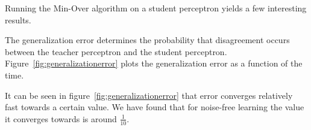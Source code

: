 Running the Min-Over algorithm on a student perceptron yields a few interesting results. 

The generalization error determines the probability that disagreement occurs between the teacher perceptron and the student perceptron. Figure~\ref{fig:generalizationerror} plots the generalization error as a function of the time.

It can be seen in figure~\ref{fig:generalizationerror} that error converges relatively fast towards a certain value. We have found that for noise-free learning the value it converges towards is around  $\frac{1}{10}$.